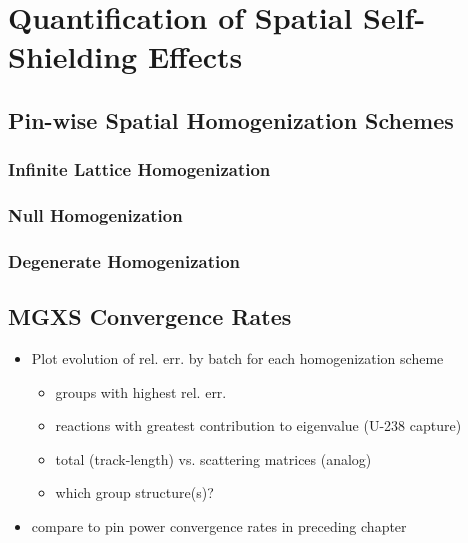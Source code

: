 \chapter{Quantification of Spatial Self-Shielding Effects}
\label{chap:quantify}


\section{Pin-wise Spatial Homogenization Schemes}
\label{sec:chap8-pinwise-space-homogenize}

\subsection{Infinite Lattice Homogenization}
\label{subsec:chap8-infinite}

\subsection{Null Homogenization}
\label{subsec:chap8-null}

\subsection{Degenerate Homogenization}
\label{subsec:chap8-degenerate}


\section{MGXS Convergence Rates}
\label{sec:chap8-mgxs-converge}

\begin{itemize}[noitemsep]
  \item Plot evolution of rel. err. by batch for each homogenization scheme
  \begin{itemize}[noitemsep]
    \item groups with highest rel. err.
    \item reactions with greatest contribution to eigenvalue (U-238 capture)
    \item total (track-length) vs. scattering matrices (analog)    
    \item which group structure(s)?
 \end{itemize}
  \item compare to pin power convergence rates in preceding chapter
\end{itemize}



